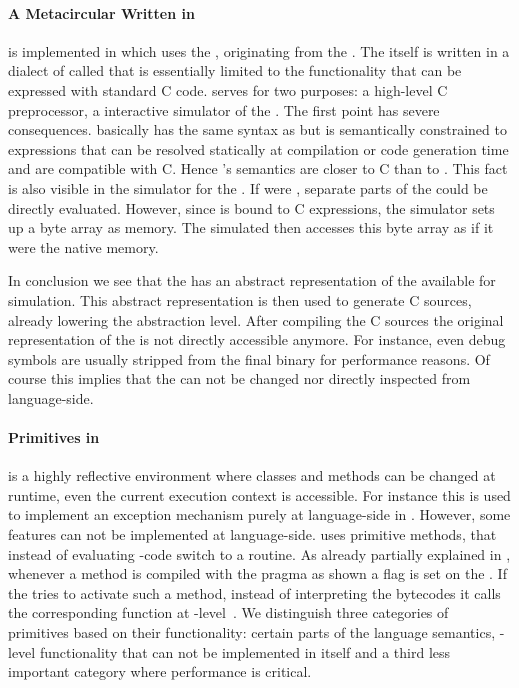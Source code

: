 \paragraph{A Metacircular \VM Written in \Slang}

\WF is implemented in \PH which uses the , originating from the \Squeak \VM\cite{Inga97a}.
The \VM itself is written in a dialect of \ST called \Slang that is essentially limited to the functionality that can be expressed with standard C code.
\Slang serves for two purposes: a high-level C preprocessor, a interactive simulator of the \VM.
The first point has severe consequences.
\Slang basically has the same syntax as \ST but is semantically constrained to expressions that can be resolved statically at compilation or code generation time and are compatible with C.
Hence \Slang's semantics are closer to C than to \ST.
This fact is also visible in the simulator for the \VM.
If \Slang were \ST, separate parts of the \VM could be directly evaluated.
However, since \Slang is bound to C expressions, the simulator sets up a byte array as memory.
The simulated \VM then accesses this byte array as if it were the native memory.

In conclusion we see that the \PH \VM has an abstract representation of the \VM available for simulation.
This abstract representation is then used to generate C sources, already lowering the abstraction level.
After compiling the C sources the original representation of the \VM is not directly accessible anymore.
For instance, even debug symbols are usually stripped from the final binary for performance reasons.
Of course this implies that the \VM can not be changed nor directly inspected from language-side.


\paragraph{Primitives in \PH}
\PH is a highly reflective environment where classes and methods can be changed at runtime, even the current execution context is accessible.
For instance this is used to implement an exception mechanism purely at language-side in \PH.
However, some features can not be implemented at language-side.
\PH uses primitive methods, that instead of evaluating \PH-code switch to a \VM routine.
As already partially explained in , whenever a method is compiled with the  pragma as shown a flag is set on the . 
If the \VM tries to activate such a method, instead of interpreting the bytecodes it calls the corresponding function at \VM-level~\cite{Gold83a}.
We distinguish three categories of primitives based on their functionality: certain parts of the language semantics, \OS-level functionality that can not be implemented in \PH itself and a third less important category where performance is critical.

